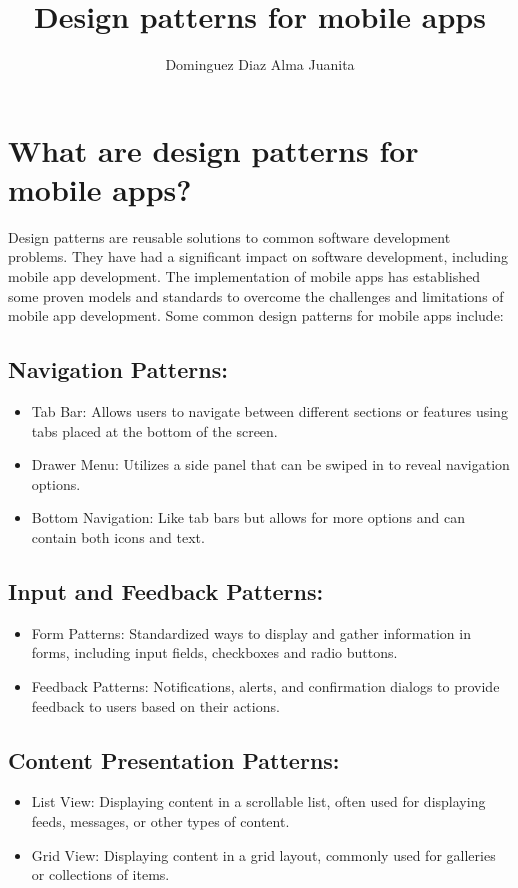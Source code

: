 \documentclass[12pt,a4paper]{article}
\author{Dominguez Diaz Alma Juanita}
\title{Design patterns for mobile apps}
\begin{document}
\maketitle
\section{What are design patterns for mobile apps?}
\justify Design patterns are reusable solutions to common software development problems. They have had a significant impact on software development, including mobile app development. The implementation of mobile apps has established some proven models and standards to overcome the challenges and limitations of mobile app development. 
Some common design patterns for mobile apps include:

\subsection{Navigation Patterns:}
\begin{itemize}
\item Tab Bar: Allows users to navigate between different sections or features using tabs placed at the bottom of the screen.

\item Drawer Menu: Utilizes a side panel that can be swiped in to reveal navigation options.

\item Bottom Navigation: Like tab bars but allows for more options and can contain both icons and text.
\end{itemize}

\subsection{Input and Feedback Patterns:}

\begin{itemize}
\item Form Patterns: Standardized ways to display and gather information in forms, including input fields, checkboxes and radio buttons.

\item Feedback Patterns: Notifications, alerts, and confirmation dialogs to provide feedback to users based on their actions.
\end{itemize}

\subsection{ Content Presentation Patterns:}
\begin{itemize}
\item List View: Displaying content in a scrollable list, often used for displaying feeds, messages, or other types of content.
\item Grid View: Displaying content in a grid layout, commonly used for galleries or collections of items.
\end{itemize}
\end{document}

